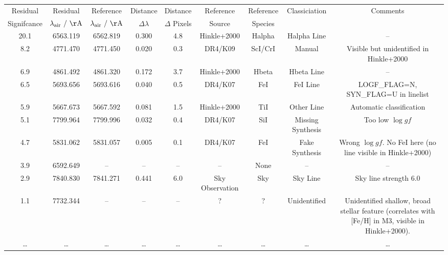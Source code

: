 \begin{tabular}{ccccccccc}
\hline
Residual    & Residual                              & Reference                             & Distance         & Distance        & Reference & Reference & Classiciation & Comments \\
Signifcance & $\lambda_\mathrm{air}~/~\mathrm{\AA}$ & $\lambda_\mathrm{air}~/~\mathrm{\AA}$ & $\Delta \lambda$ & $\Delta$ Pixels & Source    & Species   &               &          \\
\hline
20.1 & 6563.119 & 6562.819 & 0.300 & 4.8 & Hinkle+2000 & Halpha & Halpha Line & -- \\
8.2 & 4771.470 & 4771.450 & 0.020 & 0.3 & DR4/K09 & ScI/CrI & Manual & Visible but unidentified in Hinkle+2000 \\
6.9 & 4861.492 & 4861.320 & 0.172 & 3.7 & Hinkle+2000 & Hbeta & Hbeta Line & -- \\
6.5 & 5693.656 & 5693.616 & 0.040 & 0.5 & DR4/K07 & FeI & FeI Line & LOGF\_FLAG=N, SYN\_FLAG=U in linelist \\
5.9 & 5667.673 & 5667.592 & 0.081 & 1.5 & Hinkle+2000 & TiI & Other Line & Automatic classification \\
5.1 & 7799.964 & 7799.996 & 0.032 & 0.4 & DR4/K07 & SiI & Missing Synthesis & Too low $\log gf$ \\
4.7 & 5831.062 & 5831.057 & 0.005 & 0.1 & DR4/K07 & FeI & Fake Synthesis & Wrong $\log gf$. No FeI here (no line visible in Hinkle+2000) \\
3.9 & 6592.649 & -- & -- & -- & -- & None & -- & -- \\
2.9 & 7840.830 & 7841.271 & 0.441 & 6.0 & Sky Observation & Sky & Sky Line & Sky line strength 6.0 \\
1.1 & 7732.344 & -- & -- & -- & ? & ? & Unidentified & Unidentified shallow, broad stellar feature (correlates with [Fe/H] in M3, visible in Hinkle+2000). \\
\dots & \dots & \dots & \dots & \dots & \dots & \dots & \dots & \dots \\
\hline
\end{tabular}
